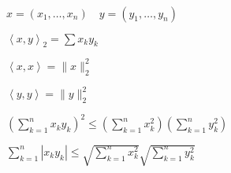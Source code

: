 \documentclass{book}
\theoremstyle{definition}
\begin{document}
   \begin{statement}
        ~\\
        $x = (x_1, \ldots, x_{n} )\quad y = (y_1, \ldots, y_{n} )$

        $\left<x, y \right>_2 = \sum x_ky_k$

        $\left<x, x \right> = \|x\|_2^2$

        $\left<y, y \right> = \|y\|_2^2$

        $\left( \sum_{k=1}^{n} x_ky_k \right) ^2 \leqslant \left( \sum_{k=1}^{n} x_k^2 \right) \left( \sum_{k=1}^{n} y_k^2 \right) $

        $\sum_{k=1}^{n} |x_ky_k|\leqslant \sqrt{\sum_{k=1}^{n} x_k^2} \sqrt{\sum_{k=1}^{n} y_k^2} $
    \end{statement}
\end{document}
